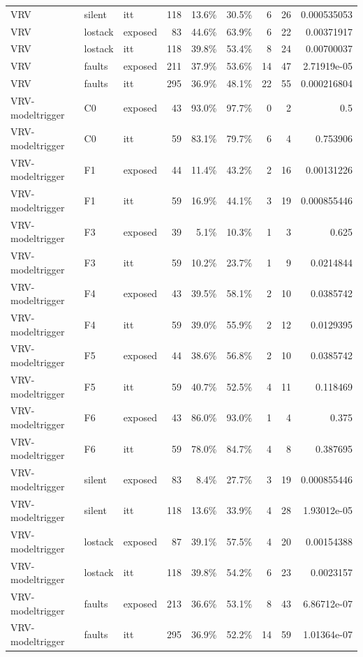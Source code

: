 \begin{tabular}{lllrrrrrr}
VRV & silent & itt & 118 & 13.6\% & 30.5\% & 6 & 26 & 0.000535053 \\
VRV & lostack & exposed & 83 & 44.6\% & 63.9\% & 6 & 22 & 0.00371917 \\
VRV & lostack & itt & 118 & 39.8\% & 53.4\% & 8 & 24 & 0.00700037 \\
VRV & faults & exposed & 211 & 37.9\% & 53.6\% & 14 & 47 & 2.71919e-05 \\
VRV & faults & itt & 295 & 36.9\% & 48.1\% & 22 & 55 & 0.000216804 \\
VRV-modeltrigger & C0 & exposed & 43 & 93.0\% & 97.7\% & 0 & 2 & 0.5 \\
VRV-modeltrigger & C0 & itt & 59 & 83.1\% & 79.7\% & 6 & 4 & 0.753906 \\
VRV-modeltrigger & F1 & exposed & 44 & 11.4\% & 43.2\% & 2 & 16 & 0.00131226 \\
VRV-modeltrigger & F1 & itt & 59 & 16.9\% & 44.1\% & 3 & 19 & 0.000855446 \\
VRV-modeltrigger & F3 & exposed & 39 & 5.1\% & 10.3\% & 1 & 3 & 0.625 \\
VRV-modeltrigger & F3 & itt & 59 & 10.2\% & 23.7\% & 1 & 9 & 0.0214844 \\
VRV-modeltrigger & F4 & exposed & 43 & 39.5\% & 58.1\% & 2 & 10 & 0.0385742 \\
VRV-modeltrigger & F4 & itt & 59 & 39.0\% & 55.9\% & 2 & 12 & 0.0129395 \\
VRV-modeltrigger & F5 & exposed & 44 & 38.6\% & 56.8\% & 2 & 10 & 0.0385742 \\
VRV-modeltrigger & F5 & itt & 59 & 40.7\% & 52.5\% & 4 & 11 & 0.118469 \\
VRV-modeltrigger & F6 & exposed & 43 & 86.0\% & 93.0\% & 1 & 4 & 0.375 \\
VRV-modeltrigger & F6 & itt & 59 & 78.0\% & 84.7\% & 4 & 8 & 0.387695 \\
VRV-modeltrigger & silent & exposed & 83 & 8.4\% & 27.7\% & 3 & 19 & 0.000855446 \\
VRV-modeltrigger & silent & itt & 118 & 13.6\% & 33.9\% & 4 & 28 & 1.93012e-05 \\
VRV-modeltrigger & lostack & exposed & 87 & 39.1\% & 57.5\% & 4 & 20 & 0.00154388 \\
VRV-modeltrigger & lostack & itt & 118 & 39.8\% & 54.2\% & 6 & 23 & 0.0023157 \\
VRV-modeltrigger & faults & exposed & 213 & 36.6\% & 53.1\% & 8 & 43 & 6.86712e-07 \\
VRV-modeltrigger & faults & itt & 295 & 36.9\% & 52.2\% & 14 & 59 & 1.01364e-07 \\

\end{tabular}
